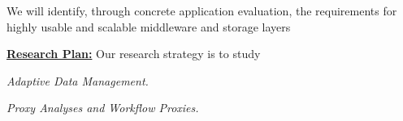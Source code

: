 \documentclass[11pt,letterpaper]{article}
\begin{document}
We will identify,   through concrete application evaluation, the requirements for highly 
usable and scalable middleware and storage layers

 
\underline{\textbf{Research Plan:}} 
Our research strategy is to study 

\emph{Adaptive Data Management.} 


\emph{Proxy Analyses and Workflow Proxies.} 




%
\end{document}
